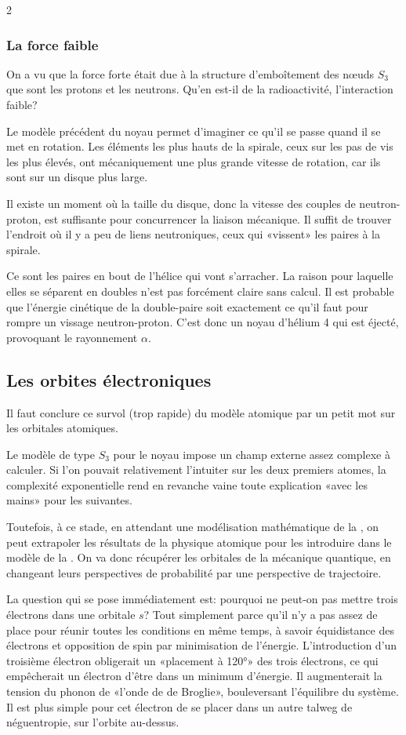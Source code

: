 \begin{multicols}{2}
\subsubsection{La force faible}

On a vu que la force forte était due à la structure d'emboîtement des
nœuds $S_3$ que sont les protons et les neutrons. Qu'en est-il de la
radioactivité, l'interaction faible?

Le modèle précédent du noyau permet d'imaginer ce qu'il se passe quand
il se met en rotation. Les éléments les plus hauts de la spirale, ceux
sur les pas de vis les plus élevés, ont mécaniquement une plus grande
vitesse de rotation, car ils sont sur un disque plus large.

Il existe un moment où la taille du disque, donc la vitesse des
couples de neutron-proton, est suffisante pour concurrencer la liaison
mécanique. Il suffit de trouver l'endroit où il y a peu de liens
neutroniques, ceux qui «vissent» les paires à la spirale.

Ce sont les paires en bout de l'hélice qui vont s'arracher. La raison
pour laquelle elles se séparent en doubles n'est pas forcément
claire sans calcul. Il est probable que l'énergie cinétique de la
double-paire soit exactement ce qu'il faut pour rompre un vissage
neutron-proton. C'est donc un noyau d'hélium 4 qui est éjecté, provoquant
le rayonnement $\alpha$.

\subsection{Les orbites électroniques}

Il faut conclure ce survol (trop rapide) du modèle atomique par un
petit mot sur les orbitales atomiques.

Le modèle de type $S_3$ pour le noyau impose un champ externe assez
complexe à calculer. Si l'on pouvait relativement l'intuiter sur les
deux premiers atomes, la complexité exponentielle rend en revanche vaine toute
explication «avec les mains» pour les suivantes.

Toutefois, à ce stade, en attendant une modélisation mathématique de la
\PQ, on peut extrapoler les résultats de la physique atomique pour les
introduire dans le modèle de la \PQ. On va donc récupérer les orbitales
de la mécanique quantique, en changeant leurs perspectives
de probabilité par une perspective de trajectoire.

La question qui se pose immédiatement est: pourquoi ne peut-on pas
mettre trois électrons dans une orbitale $s$? Tout simplement parce qu'il
n'y a pas assez de place pour réunir toutes les conditions en même
temps, à savoir équidistance des électrons et opposition de spin par
minimisation de l'énergie. L'introduction d'un troisième électron
obligerait un «placement à 120°» des trois électrons, ce qui
empêcherait un électron d'être dans un minimum d'énergie. Il
augmenterait la tension du phonon de «l'onde de de Broglie»,
bouleversant l'équilibre du système. Il est plus simple pour cet
électron de se placer dans un autre talweg de néguentropie, sur
l'orbite au-dessus.


\end{multicols}
